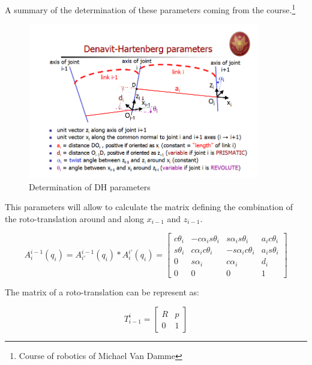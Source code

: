 A summary of the determination of these parameters coming from the course.\footnote{Course of robotics of Michael Van Damme}

\begin{figure}[!ht]
	\centering
    \includegraphics[width = 0.9\textwidth]{Images/DHparameters}
    \caption{Determination of DH parameters}
    \label{fig:DH}
\end{figure}

This parameters will allow to calculate the matrix defining the combination of the roto-translation around and along $x_{i-1}$ and $z_{i-1}$. \\

\begin{center}
	\begin{equation}
		A^{i-1}_{i}(q_i) = A^{i-1}_{i'}(q_i) * A^{i'}_{i}(q_i) = \begin{bmatrix}
		c\theta_i & -c\alpha_is\theta_i & s\alpha_is\theta_i & a_ic\theta_i \\
        s\theta_i & c\alpha_ic\theta_i & -s\alpha_ic\theta_i & a_is\theta_i \\
        0 & s \alpha_i & c \alpha_i & d_i\\
        0 & 0 & 0 & 1
		\end{bmatrix}
	\end{equation}
\end{center}


The matrix of a roto-translation can be represent as: \\
\begin{center}
	 \begin{equation}
	 	T^i_{i-1} = \begin{bmatrix}
	 	R & p\\ 0 & 1
	 	\end{bmatrix}
	 \end{equation}
\end{center}

